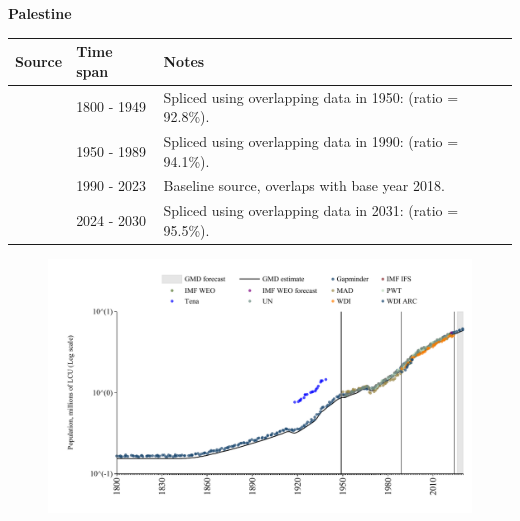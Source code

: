 \documentclass[12pt,a4paper,landscape]{article}
\begin{document}
\begin{adjustbox}{max totalsize={\paperwidth}{\paperheight},center}
\begin{minipage}[t][\textheight][t]{\textwidth}
\vspace*{0.5cm}
{}
\begin{center}
{\Large\bfseries Palestine}
\end{center}
\vspace{0.5cm}
\begin{table}[H]
\centering
\small
\begin{tabular}{|l|l|l|}
\hline
\textbf{Source} & \textbf{Time span} & \textbf{Notes} \\
\hline
\rowcolor{white}\cite{Gapminder}& 1800 - 1949 &Spliced using overlapping data in 1950: (ratio = 92.8\%).\\
\rowcolor{lightgray}\cite{IMF_IFS}& 1950 - 1989 &Spliced using overlapping data in 1990: (ratio = 94.1\%).\\
\rowcolor{white}\cite{WDI}& 1990 - 2023 &Baseline source, overlaps with base year 2018.\\
\rowcolor{lightgray}\cite{Gapminder}& 2024 - 2030 &Spliced using overlapping data in 2031: (ratio = 95.5\%).\\
\hline
\end{tabular}
\end{table}
\begin{figure}[H]
\centering
\includegraphics[width=\textwidth,height=0.6\textheight,keepaspectratio]{graphs/PSE_pop.pdf}
\end{figure}
\end{minipage}
\end{adjustbox}
\end{document}
